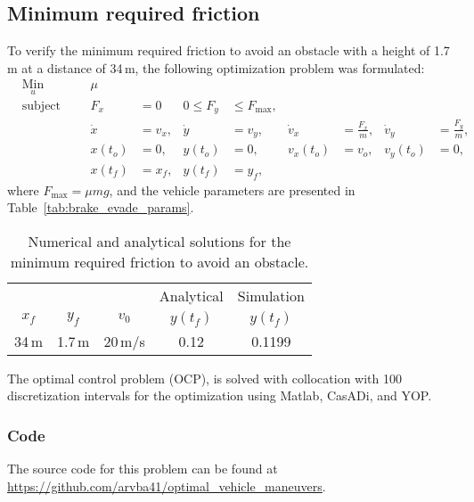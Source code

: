 \subsection{Minimum required friction}
To verify the minimum required friction to avoid an obstacle with a height of 1.7\,m at a distance of 34\,m, the following optimization problem was formulated:
\begin{align}
    & \underset{u}{\text{Min}}
    & & & \mu\\
%
    & \text{subject to} 
    & & & F_x &= 0 &0 \leq F_y &\leq F_{\text{max}},\\
%
    &&& & \dot x &= v_x, & \dot y &= v_y, & \dot v_x &= \frac{F_x}{m}, & \dot v_y &= \frac{F_y}{m},\\
%
    &&& & x(t_o) &= 0, & y(t_o) &= 0, & v_x(t_o) &= v_o, & v_y(t_o) &= 0,\\
    &&& & x(t_f) &= x_f, & y(t_f) &= y_f,
\end{align}
where $F_{\text{max}} = \mu m g$, and the vehicle parameters are presented in Table~\ref{tab:brake_evade_params}.
\begin{table}[h!]
    \centering
    \begin{tabular}{c|c|c|c|c}
        & & & Analytical & Simulation\\
        $x_f$ & $y_f$ & $v_0$ & $y(t_f)$ & $y(t_f)$ \\
        \hline
        34\,m & 1.7\,m & 20\,m/s & 0.12 & 0.1199 \\
    \end{tabular}
    \caption{Numerical and analytical solutions for the minimum required friction to avoid an obstacle.}
\end{table}

The optimal control problem (OCP), is solved with collocation with 100 discretization intervals for the optimization using Matlab, CasADi, and YOP. 

\subsubsection{Code}
The source code for this problem can be found at \newline \href{https://github.com/arvba41/optimal_vehicle_maneuvers/blob/main/uppgift/ugf3/brake_or_evade_p2b.m}{https://github.com/arvba41/optimal\_vehicle\_maneuvers}.
